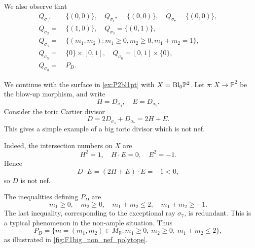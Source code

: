 \begin{example}
    We also observe that
    \[
    \begin{aligned}
    Q_{\sigma_1'}=&\{(0,0)\},\quad Q_{\sigma_1''}=\{(0,0)\},\quad Q_{\sigma_7}=\{(0,0)\},\\
    Q_{\sigma_2}=&\{(1,0)\},\quad Q_{\sigma_3}=\{(0,1)\},\\
    Q_{\sigma_4}=& \{(m_1,m_2):m_1\geq 0,m_2\geq 0,m_1+m_2=1\},\\
    Q_{\sigma_5}=& \{0\}\times [0,1],\quad Q_{\sigma_6}= [0,1]\times \{0\},\\
    Q_{\sigma_0}=& P_D.
    \end{aligned}
    \]
\end{example}

\begin{example}\label{ex:F1big_non_nef}
    We continue with the surface in \cref{ex:P2bl1pt} with $X=\mathrm{Bl}_0\mathbb{P}^2$. Let $\pi\colon X\rightarrow \mathbb{P}^2$ be the blow-up morphism, and write
    \[
        H=D_{\sigma_4},\quad E=D_{\sigma_7}.
    \]
    Consider the toric Cartier divisor
    \[
        D=2D_{\sigma_4}+D_{\sigma_7}=2H+E.
    \]
    This gives a simple example of a big toric divisor which is not nef.

    Indeed, the intersection numbers on $X$ are
    \[
    H^2=1,\quad H\cdot E=0,\quad E^2=-1.
    \]
    Hence
    \[
    D\cdot E=(2H+E)\cdot E=-1<0,
    \]
    so $D$ is not nef.

    The inequalities defining $P_D$ are
    \[
    m_1\geq 0,\quad m_2\geq 0,\quad m_1+m_2\leq 2,\quad m_1+m_2\geq -1.
    \]
    The last inequality, corresponding to the exceptional ray $\sigma_7$, is redundant. This is a typical phenomenon in the non-ample situation.
    Thus
    \[
    P_D=\{m=(m_1,m_2)\in M_{\mathbb{R}}:m_1\geq 0,\ m_2\geq 0,\ m_1+m_2\leq 2\},
    \]
    as illustrated in \cref{fig:F1big_non_nef_polytope}.
    \begin{figure}[ht]
        \centering
\end{figure}
\end{example}
